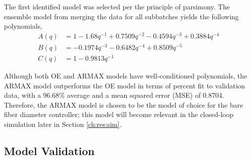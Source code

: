 The first identified model was selected per the principle of parsimony. The ensemble model from merging the data for all subbatches yields the following polynomials, 
\begin{equation*}
    \begin{split}
        A(q) & = 1 - 1.68 q^{-1} + 0.7509 q^{-2} - 0.4594 q^{-3} + 0.3884 q^{-4} \\
        B(q) & = -0.1974 q^{-3} - 0.6482 q^{-4} + 0.8509 q^{-5} \\
        C(q) & = 1 - 0.9813 q^{-1}
    \end{split}
\end{equation*}

Although both OE and ARMAX models have well-conditioned polynomials, the ARMAX model outperforms the OE model in terms of percent fit to validation data, with a $96.68\%$ average and a mean squared error (MSE) of 0.8704. Therefore, the ARMAX model is chosen to be the model of choice for the bare fiber diameter controller; this model will become relevant in the closed-loop simulation later in Section \ref{ch:res:sim}. 

\subsection*{Model Validation} \label{ch:sysid:case:val}

